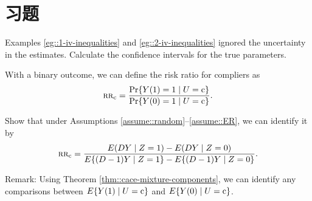 \section{习题}\label{sec:22-homework}

\begin{HomeworkProblem}\label{exr:22-1}

Examples \ref{eg::1-iv-inequalities} and \ref{eg::2-iv-inequalities} ignored the uncertainty in the estimates. Calculate the confidence intervals for the true parameters.




\end{HomeworkProblem}

\begin{HomeworkProblem}\label{exr:22-2}


With a binary outcome, we can define the risk ratio for compliers as
\[
\textsc{rr}_{\textup{c}} = \frac{  \operatorname{Pr}\{  Y(1) = 1\mid U = \textup{c} \}  }{ \operatorname{Pr}\{  Y(0) = 1\mid U = \textup{c} \}   } .
\]

Show that under Assumptions \ref{assume::random}--\ref{assume::ER}, we can identify it by
\[
\textsc{rr}_{\textup{c}} =  \frac{  E(DY\mid Z=1)  - E(DY\mid Z=0)  }{  E\{  (D-1)Y\mid Z=1 \}   - E\{ (D-1)Y\mid Z=0 \} }.
\]



Remark: Using Theorem \ref{thm::cace-mixture-components}, we can identify any comparisons between $E\{  Y(1) \mid U = \textup{c} \} $ and $E\{  Y(0) \mid U = \textup{c} \} $.


\end{HomeworkProblem}

